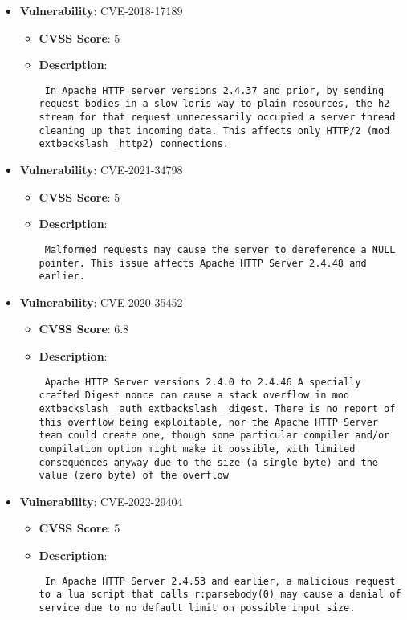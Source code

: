 \documentclass{article}
\begin{document}
\begin{itemize}
        \item \textbf{Vulnerability}: CVE-2018-17189
        \begin{itemize}
            \item \textbf{CVSS Score}:  5 
            \item \textbf{Description}: \parbox{\linewidth}{\texttt{ In Apache HTTP server versions 2.4.37 and prior, by sending request bodies in a slow loris way to plain resources, the h2 stream for that request unnecessarily occupied a server thread cleaning up that incoming data. This affects only HTTP/2 (mod	extbackslash _http2) connections. }}
        \end{itemize}
    
        \item \textbf{Vulnerability}: CVE-2021-34798
        \begin{itemize}
            \item \textbf{CVSS Score}:  5 
            \item \textbf{Description}: \parbox{\linewidth}{\texttt{ Malformed requests may cause the server to dereference a NULL pointer. This issue affects Apache HTTP Server 2.4.48 and earlier. }}
        \end{itemize}
    
        \item \textbf{Vulnerability}: CVE-2020-35452
        \begin{itemize}
            \item \textbf{CVSS Score}:  6.8 
            \item \textbf{Description}: \parbox{\linewidth}{\texttt{ Apache HTTP Server versions 2.4.0 to 2.4.46 A specially crafted Digest nonce can cause a stack overflow in mod	extbackslash _auth	extbackslash _digest. There is no report of this overflow being exploitable, nor the Apache HTTP Server team could create one, though some particular compiler and/or compilation option might make it possible, with limited consequences anyway due to the size (a single byte) and the value (zero byte) of the overflow }}
        \end{itemize}
    
        \item \textbf{Vulnerability}: CVE-2022-29404
        \begin{itemize}
            \item \textbf{CVSS Score}:  5 
            \item \textbf{Description}: \parbox{\linewidth}{\texttt{ In Apache HTTP Server 2.4.53 and earlier, a malicious request to a lua script that calls r:parsebody(0) may cause a denial of service due to no default limit on possible input size. }}
        \end{itemize}
    

\end{itemize}
\end{document}
